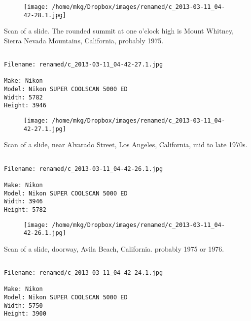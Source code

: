 \begin{figure}
\texttt{[image: /home/mkg/Dropbox/images/renamed/c\_2013-03-11\_04-42-28.1.jpg]}
\end{figure}
    
\clearpage
\onecolumn
\noindent Scan of a slide. The rounded summit at one o'clock high is Mount Whitney, Sierra Nevada Mountains, California, probably 1975.
\noindent
\begin{lstlisting}

Filename: renamed/c_2013-03-11_04-42-27.1.jpg

Make: Nikon
Model: Nikon SUPER COOLSCAN 5000 ED
Width: 5782
Height: 3946
\end{lstlisting}
\clearpage

\begin{figure}
\texttt{[image: /home/mkg/Dropbox/images/renamed/c\_2013-03-11\_04-42-27.1.jpg]}
\end{figure}
    
\clearpage
\onecolumn
\noindent Scan of a slide, near Alvarado Street, Los Angeles, California, mid to late 1970s.
\noindent
\begin{lstlisting}

Filename: renamed/c_2013-03-11_04-42-26.1.jpg

Make: Nikon
Model: Nikon SUPER COOLSCAN 5000 ED
Width: 3946
Height: 5782
\end{lstlisting}
\clearpage

\begin{figure}
\texttt{[image: /home/mkg/Dropbox/images/renamed/c\_2013-03-11\_04-42-26.1.jpg]}
\end{figure}
    
\clearpage
\onecolumn
\noindent Scan of a slide, doorway, Avila Beach, California. probably 1975 or 1976.
\noindent
\begin{lstlisting}

Filename: renamed/c_2013-03-11_04-42-24.1.jpg

Make: Nikon
Model: Nikon SUPER COOLSCAN 5000 ED
Width: 5750
Height: 3900
\end{lstlisting}
\clearpage

